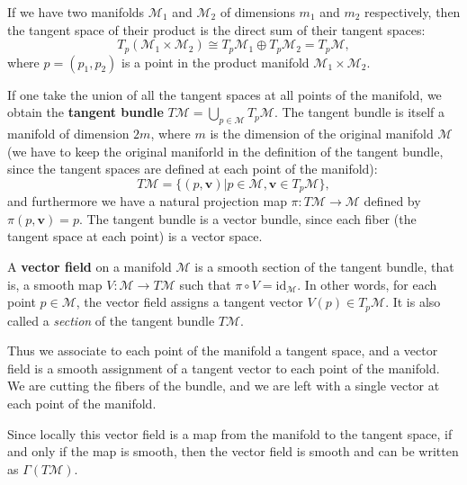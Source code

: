 \begin{corollary}
    If we have two manifolds \(\mathcal{M}_1\) and \(\mathcal{M}_2\) of dimensions \(m_1\) and \(m_2\) respectively, then the tangent space of their product is the direct sum of their tangent spaces:
    \[
        T_p(\mathcal{M}_1 \times \mathcal{M}_2) \cong T_p\mathcal{M}_1 \oplus T_p\mathcal{M}_2 = T_p \mathcal{M},
    \]
    where \(p = (p_1, p_2)\) is a point in the product manifold \(\mathcal{M}_1 \times \mathcal{M}_2\).
\end{corollary}

\begin{definition}
    If one take the union of all the tangent spaces at all points of the manifold, we obtain the \textbf{tangent bundle} \(T\mathcal{M} = \bigcup_{p \in \mathcal{M}} T_p \mathcal{M}\). The tangent bundle is itself a manifold of dimension \(2m\), where \(m\) is the dimension of the original manifold \(\mathcal{M}\) (we have to keep the original maniforld in the definition of the tangent bundle, since the tangent spaces are defined at each point of the manifold):
    \[
        T\mathcal{M} = \{ (p,\mathbf{v}) | p \in \mathcal{M}, \mathbf{v} \in T_p \mathcal{M} \},
    \]
    and furthermore we have a natural projection map \(\pi : T\mathcal{M} \to \mathcal{M}\) defined by \(\pi(p,\mathbf{v}) = p\). The tangent bundle is a vector bundle, since each fiber (the tangent space at each point) is a vector space.
\end{definition}

\begin{definition}
    A \textbf{vector field} on a manifold \(\mathcal{M}\) is a smooth section of the tangent bundle, that is, a smooth map \(V : \mathcal{M} \to T\mathcal{M}\) such that \(\pi \circ V = \mathrm{id}_{\mathcal{M}}\). In other words, for each point \(p \in \mathcal{M}\), the vector field assigns a tangent vector \(V(p) \in T_p \mathcal{M}\). It is also called a \textit{section} of the tangent bundle \(T\mathcal{M}\).
\end{definition}

Thus we associate to each point of the manifold a tangent space, and a vector field is a smooth assignment of a tangent vector to each point of the manifold. We are cutting the fibers of the bundle, and we are left with a single vector at each point of the manifold.

Since locally this vector field is a map from the manifold to the tangent space, if and only if the map is smooth, then the vector field is smooth and can be written as \(\Gamma(T\mathcal{M})\).





